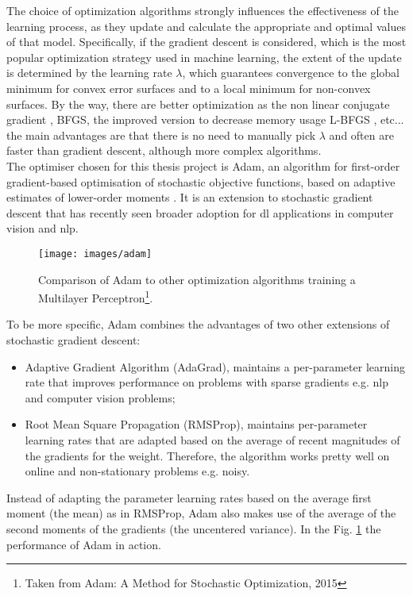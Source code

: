 \noindent The choice of optimization algorithms strongly influences the effectiveness of the learning process, as they update and calculate the appropriate and optimal values of that model. Specifically, if the gradient descent is considered, which is the most popular optimization strategy used in machine learning, the extent of the update is determined by the learning rate $\lambda$, which guarantees convergence to the global minimum for convex error surfaces and to a local minimum for non-convex surfaces. By the way, there are better optimization as the non linear conjugate gradient \cite[]{conjugategradient}, BFGS, the improved version to decrease memory usage L-BFGS \cite[]{saputro2017limited}, etc... the main advantages are that there is no need to manually pick $\lambda$ and often are faster than gradient descent, although more complex algorithms. \\

\noindent The optimiser chosen for this thesis project is Adam, an algorithm for first-order gradient-based optimisation of stochastic objective functions, based on adaptive estimates of lower-order moments \cite[]{kingma2017adam}. It is an extension to stochastic gradient descent that has recently seen broader adoption for \gls{dl} applications in computer vision and \gls{nlp}.

\begin{figure}[H]
	\begin{minipage}{\textwidth}
		\centering
		\texttt{[image: images/adam]}
		\caption[Comparison of Adam to other optimization algorithms.]{Comparison of Adam to other optimization algorithms training a Multilayer Perceptron\footnote{Taken from Adam: A Method for Stochastic Optimization, 2015}.}
		\label{fig:adam}
	\end{minipage}
\end{figure}

\noindent To be more specific, Adam combines the advantages of two other extensions of stochastic gradient descent:

\begin{itemize}
    \item Adaptive Gradient Algorithm (AdaGrad), maintains a per-parameter learning rate that improves performance on problems with sparse gradients e.g. \gls{nlp} and computer vision problems;
    \item Root Mean Square Propagation (RMSProp), maintains per-parameter learning rates that are adapted based on the average of recent magnitudes of the gradients for the weight. Therefore, the algorithm works pretty well on online and non-stationary problems e.g. noisy.
\end{itemize}

\noindent Instead of adapting the parameter learning rates based on the average first moment (the mean) as in RMSProp, Adam also makes use of the average of the second moments of the gradients (the uncentered variance). In the Fig. \ref{fig:adam} the performance of Adam in action.